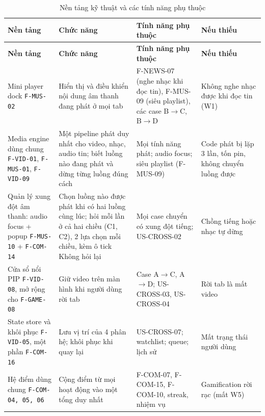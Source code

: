 \begin{longtable}{>{\raggedright\arraybackslash}p{2.9cm} >{\raggedright\arraybackslash}p{4.6cm} >{\raggedright\arraybackslash}p{3.6cm} >{\raggedright\arraybackslash}p{3.5cm}}
\caption{Nền tảng kỹ thuật và các tính năng phụ thuộc}
\label{tab:mechanisms}\\
\toprule
\textbf{Nền tảng} & \textbf{Chức năng} & \textbf{Tính năng phụ thuộc} & \textbf{Nếu thiếu} \\
\midrule
\endfirsthead
\toprule
\textbf{Nền tảng} & \textbf{Chức năng} & \textbf{Tính năng phụ thuộc} & \textbf{Nếu thiếu} \\
\midrule
\endhead
\bottomrule
\endfoot
Mini player dock \newline \texttt{F-MUS-02} & Hiển thị và điều khiển nội dung âm thanh đang phát ở mọi tab & F-NEWS-07 (nghe nhạc khi đọc tin), F-MUS-09 (siêu playlist), các case B$\rightarrow$C, B$\rightarrow$D & Không nghe nhạc được khi đọc tin (W1) \\
\midrule
Media engine dùng chung \newline \texttt{F-VID-01}, \texttt{F-MUS-01}, \texttt{F-VID-09} & Một pipeline phát duy nhất cho video, nhạc, audio tin; biết luồng nào đang phát và dừng từng luồng đúng cách & Mọi tính năng phát; audio focus; siêu playlist (F-MUS-09) & Code phát bị lặp 3 lần, tốn pin, không chuyển luồng được \\
\midrule
Quản lý xung đột âm thanh: audio focus + popup \newline \texttt{F-MUS-10} + \texttt{F-COM-14} & Chọn luồng nào được phát khi có hai luồng cùng lúc; hỏi mỗi lần ở cả hai chiều (C1, C2), 2 lựa chọn mỗi chiều, kèm ô tick Không hỏi lại & Mọi case chuyển có xung đột tiếng; US-CROSS-02 & Chồng tiếng hoặc nhạc tự dừng \\
\midrule
Cửa sổ nổi PIP \newline \texttt{F-VID-08}, mở rộng cho \texttt{F-GAME-08} & Giữ video trên màn hình khi người dùng rời tab & Case A$\rightarrow$C, A$\rightarrow$D; US-CROSS-03, US-CROSS-04 & Rời tab là mất video \\
\midrule
State store và khôi phục \newline \texttt{F-VID-05}, một phần \texttt{F-COM-16} & Lưu vị trí của 4 phân hệ; khôi phục khi quay lại & US-CROSS-07; watchlist; queue; lịch sử & Mất trạng thái người dùng \\
\midrule
Hệ điểm dùng chung \newline \texttt{F-COM-04, 05, 06} & Cộng điểm từ mọi hoạt động vào một tổng duy nhất & F-COM-07, F-COM-15, F-COM-10, streak, nhiệm vụ & Gamification rời rạc (mất W5) \\

\end{longtable}
